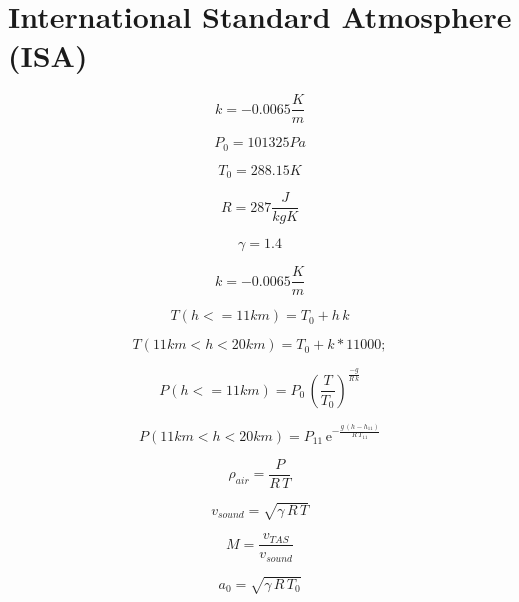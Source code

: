 \documentclass{article}
\begin{document}
\newpage

\section{International Standard Atmosphere (ISA)}
\begin{dmath}
k=-0.0065\frac{K}{m}
\end{dmath}

\begin{dmath}
P_{0}=101325Pa
\end{dmath}

\begin{dmath}
T_{0}=288.15K
\end{dmath}

\begin{dmath}
R=287\frac{J}{kgK}
\end{dmath}

\begin{dmath}
\gamma=1.4
\end{dmath}

\begin{dmath}
k=-0.0065\frac{K}{m}
\end{dmath}

\begin{dmath}
T(h <= 11 km)=T_{0}+h\,k
\end{dmath}

\begin{dmath}
T(11 km < h < 20 km)=T_0 + k*11000;
\end{dmath}

\begin{dmath}
P(h <= 11 km)=P_{0}\,\left(\frac{T}{T_{0}}\right)^{\frac{-g}{R\,k}}
\end{dmath}

\begin{dmath}
P(11 km < h < 20 km)=P_{11}\,{\mathrm{e}}^{-\frac{g\,\left(h-h_{11}\right)}{R\,T_{11}}}
\end{dmath}

\begin{dmath}
\rho_{air}=\frac{P}{R\,T}
\end{dmath}

\begin{dmath}
v_{sound}=\sqrt{\gamma\,R\,T}
\end{dmath}

\begin{dmath}
M=\frac{v_{TAS}}{v_{sound}}
\end{dmath}

\begin{dmath}
a_{0}=\sqrt{\gamma\,R\,T_{0}}
\end{dmath}
\end{document}
